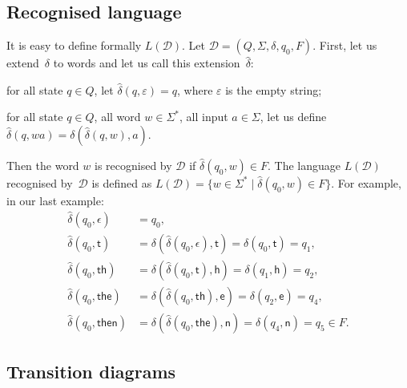 \subsection*{Recognised language}

It is easy to define formally \(L(\mathcal{D})\). Let \(\mathcal{D} =
(Q, \Sigma, \delta, q_0, F)\). First, let us extend~\(\delta\) to
words and let us call this extension~\(\hat{\delta}\):
\begin{itemize*}

  \item for all state \(q \in Q\), let \(\hat{\delta} (q, \varepsilon)
    = q\), where \(\varepsilon\) is the empty string;

  \item for all state \(q \in Q\), all word \(w \in \Sigma^{*}\), all
    input \(a \in \Sigma\), let us define \(\hat{\delta} (q, wa) =
    \delta (\hat{\delta}(q,w),a)\).

\end{itemize*}
Then the word \(w\) is recognised by \(\mathcal{D}\) if
\(\hat{\delta}(q_0, w) \in F\). The language \(L(\mathcal{D})\)
recognised by~\(\mathcal{D}\) is defined as \(L(\mathcal{D}) = \{w \in
\Sigma^{*} \; \lvert \; \hat{\delta}(q_0, w) \in F\}\). For example,
in our last example:
\begin{equation*}
\begin{aligned}
   \hat{\delta}(q_0, \epsilon)
&= q_0,\\
   \hat{\delta}(q_0, \textsf{t})
&= \delta (\hat{\delta}(q_0, \epsilon), \textsf{t})
= \delta (q_0, \textsf{t})
= q_1,\\
   \hat{\delta}(q_0, \textsf{th})
&= \delta (\hat{\delta}(q_0, \textsf{t}), \textsf{h})
= \delta (q_1, \textsf{h})
= q_2,\\
   \hat{\delta}(q_0, \textsf{the})
&= \delta (\hat{\delta}(q_0, \textsf{th}), \textsf{e})
= \delta (q_2, \textsf{e})
= q_4,\\
   \hat{\delta}(q_0, \textsf{then})
&= \delta (\hat{\delta}(q_0, \textsf{the}), \textsf{n})
= \delta (q_4, \textsf{n})
= q_5 \in F.
\end{aligned}
\end{equation*}

\subsection*{Transition diagrams}

